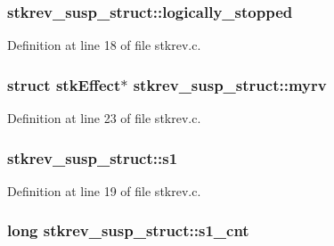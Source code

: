 \subsubsection[{\texorpdfstring{logically\+\_\+stopped}{logically_stopped}}]{ stkrev\+\_\+susp\+\_\+struct\+::logically\+\_\+stopped}\hypertarget{structstkrev__susp__struct_afe2e2fba2c4a2b215020db743490c0f4}{}\label{structstkrev__susp__struct_afe2e2fba2c4a2b215020db743490c0f4}


Definition at line 18 of file stkrev.\+c.

\subsubsection[{\texorpdfstring{myrv}{myrv}}]{\setlength{\rightskip}{0pt plus 5cm}struct {\bf stk\+Effect}$\ast$ stkrev\+\_\+susp\+\_\+struct\+::myrv}\hypertarget{structstkrev__susp__struct_a31850b2e019d485f801f6052e74344bd}{}\label{structstkrev__susp__struct_a31850b2e019d485f801f6052e74344bd}


Definition at line 23 of file stkrev.\+c.

\subsubsection[{\texorpdfstring{s1}{s1}}]{ stkrev\+\_\+susp\+\_\+struct\+::s1}\hypertarget{structstkrev__susp__struct_aee767850f53ed819497f865558d02bdf}{}\label{structstkrev__susp__struct_aee767850f53ed819497f865558d02bdf}


Definition at line 19 of file stkrev.\+c.

\subsubsection[{\texorpdfstring{s1\+\_\+cnt}{s1_cnt}}]{\setlength{\rightskip}{0pt plus 5cm}long stkrev\+\_\+susp\+\_\+struct\+::s1\+\_\+cnt}\hypertarget{structstkrev__susp__struct_af0c2ee4b9cf841facb8c31a661aa3cd3}{}\label{structstkrev__susp__struct_af0c2ee4b9cf841facb8c31a661aa3cd3}


